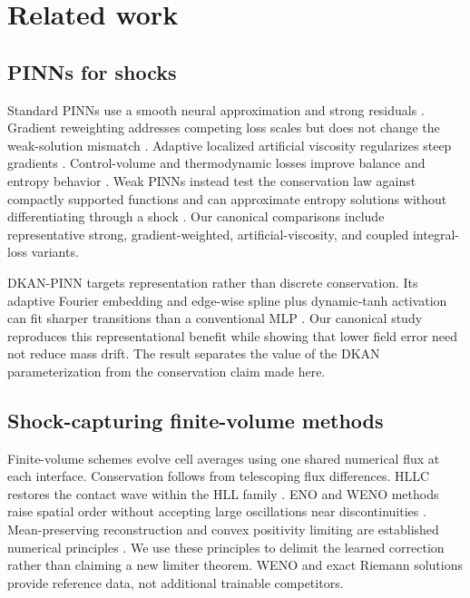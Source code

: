 \documentclass[10pt,twocolumn]{article}
\begin{document}
\section{Related work}

\subsection{PINNs for shocks}

Standard PINNs use a smooth neural approximation and strong residuals \citep{raissi2019pinn}. Gradient reweighting addresses competing loss scales but does not change the weak-solution mismatch \citep{wang2021gradient}. Adaptive localized artificial viscosity regularizes steep gradients \citep{coutinho2023avpinn}. Control-volume and thermodynamic losses improve balance and entropy behavior \citep{patel2022thermodynamic}. Weak PINNs instead test the conservation law against compactly supported functions and can approximate entropy solutions without differentiating through a shock \citep{deryck2024wpinn}. Our canonical comparisons include representative strong, gradient-weighted, artificial-viscosity, and coupled integral-loss variants.

DKAN-PINN targets representation rather than discrete conservation. Its adaptive Fourier embedding and edge-wise spline plus dynamic-tanh activation can fit sharper transitions than a conventional MLP \citep{lei2026dkanpinn}. Our canonical study reproduces this representational benefit while showing that lower field error need not reduce mass drift. The result separates the value of the DKAN parameterization from the conservation claim made here.

\subsection{Shock-capturing finite-volume methods}

Finite-volume schemes evolve cell averages using one shared numerical flux at each interface. Conservation follows from telescoping flux differences. HLLC restores the contact wave within the HLL family \citep{toro1994hllc}. ENO and WENO methods raise spatial order without accepting large oscillations near discontinuities \citep{jiang1996weno,borges2008wenoz}. Mean-preserving reconstruction and convex positivity limiting are established numerical principles \citep{zhang2010positivitydg,zhang2012positivityweno}. We use these principles to delimit the learned correction rather than claiming a new limiter theorem. WENO and exact Riemann solutions provide reference data, not additional trainable competitors.
\end{document}
